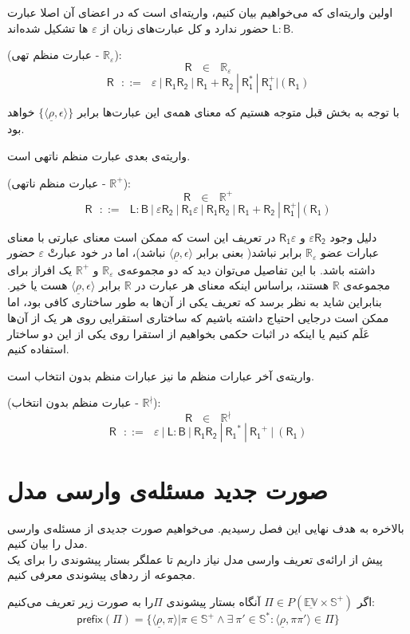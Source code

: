اولین واریته‌ای که می‌خواهیم بیان کنیم، واریته‌ای است که در اعضای آن اصلا عبارت 
$\mathsf{L : B}$
حضور ندارد و کل عبارت‌های زبان از $\varepsilon$ ها تشکیل شده‌اند.
\begin{defn}
	(عبارت منظم تهی - $\mathbb{R_\varepsilon}$): 
	$$\mathsf{R} \:\:\:\in\:\:\: \mathbb{R}_\varepsilon$$
	$$\mathsf{R}\:\:\: ::= \:\:\: \varepsilon \: | \: \mathsf{R_1 R_2} \: | 
	\: \mathsf{R_1 + R_2} \: | \: \mathsf{R_1^*} \: | \: \mathsf{R_1^+} | (\mathsf{R_1})$$
\end{defn}


 با توجه به بخش قبل متوجه هستیم که معنای همه‌ی این عبارت‌ها برابر 
$\{\langle \underline{\rho} , \epsilon \rangle\}$
خواهد بود.

واریته‌ی بعدی عبارت منظم ناتهی است.
\begin{defn}
	(عبارت منظم ناتهی - $\mathbb{R}^+$):
	$$\mathsf{R} \:\:\:\in\:\:\: \mathbb{R}^+$$
	$$\mathsf{R}\:\:\: ::= \:\:\: \mathsf{L:B} \: |
	\: \mathsf{\varepsilon R_2} \: | \: \mathsf{R_1 \varepsilon} \: |
	\: \mathsf{R_1 R_2} \: | 
	\: \mathsf{R_1 + R_2} \: | \: \mathsf{R_1^+} | (\mathsf{R_1})$$
\end{defn}
دلیل وجود 
$\mathsf{\varepsilon R_2}$
و 
$\mathsf{R_1 \varepsilon}$
در تعریف این است که ممکن است معنای عبارتی با معنای عبارات عضو $\mathbb{R}_\varepsilon$ برابر نباشد( بعنی برابر ${\langle \underline{\rho} , \epsilon \rangle}$ نباشد)، اما در خود عبارتْ $\varepsilon$ حضور داشته باشد. با این تفاصیل می‌توان دید که دو مجموعه‌ی 
$\mathbb{R}_\varepsilon$
و
$\mathbb{R}^+$
یک افراز برای مجموعه‌ی $\mathbb{R}$ هستند، براساس اینکه معنای هر عبارت در $\mathbb{R}$ برابر ${\langle \underline{\rho} , \epsilon \rangle}$ هست یا خیر. بنابراین شاید به نظر برسد که تعریف یکی از آن‌ها به طور ساختاری کافی بود، اما ممکن است درجایی احتیاج داشته باشیم که ساختاری استقرایی روی هر یک از آن‌ها عَلَم کنیم یا اینکه در اثبات حکمی بخواهیم از استقرا روی یکی از این دو ساختار استفاده کنیم.

واریته‌ی آخر عبارات منظم ما نیز عبارات منظم بدون انتخاب است.
\begin{defn}
(عبارت منظم بدون انتخاب - $\mathbb{R}^\nmid$):
$$
\mathsf{R}\:\:\: \in \:\:\: \mathbb{R}^\nmid$$
$$
\mathsf{R}\:\:\: ::= \:\:\: \varepsilon \: | \: \mathsf{L:B} \: | \:
\mathsf{R_1 R_2} \: | \: \mathsf{R_1}^* \: | \: \mathsf{R_1}^+ \: | \:
(\mathsf{R_1})$$
\end{defn}

\section{صورت جدید مسئله‌ی وارسی مدل}
بالاخره به هدف نهایی این فصل رسیدیم. می‌خواهیم صورت جدیدی از مسئله‌ی وارسی مدل را بیان ‌کنیم.\\
پیش از ارائه‌ی تعریف وارسی مدل نیاز داریم تا عملگر بستار پیشوندی را برای یک مجموعه از ردهای پیشوندی معرفی کنیم.
\begin{defn}
	اگر 
	$\Pi \in \mathit{P}(\mathbb{\underline{EV}\times S^+})$
	آنگاه بستار پیشوندی $\Pi$را به صورت زیر تعریف می‌کنیم:
	$$\mathsf{prefix}(\Pi)=
	\{\langle \underline{\rho},\pi\rangle | \pi \in \mathbb{S^+} \land \exists\
	\pi' \in \mathbb{S^*}: \langle \underline{\rho}, \pi \pi' \rangle \in \Pi \}$$
\end{defn}

